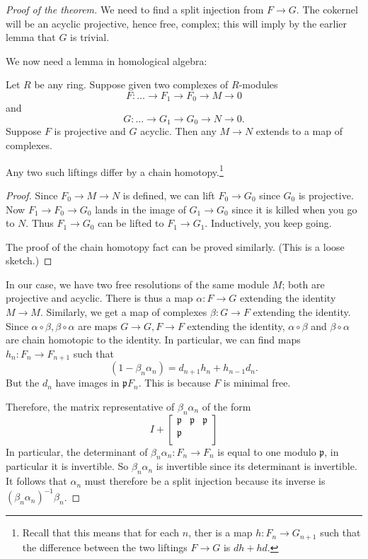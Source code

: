 \begin{proof}[Proof of the theorem]
We need to find a split injection from $F \to G$. The cokernel will be an
acyclic projective, hence free, complex; this will imply by the earlier lemma
that $G$ is trivial.

We now need a lemma in homological algebra:
\begin{lemma} Let $R$ be any ring.
Suppose given two complexes of $R$-modules
\[ F: \dots \to F_1 \to F_0 \to M \to 0  \]
and
\[ G: \dots \to G_1 \to G_0 \to N \to 0.  \]
Suppose $F$ is projective and $G$ acyclic. Then any $M \to N$ extends to a map
of complexes. 

Any two such liftings differ by a chain homotopy.\footnote{Recall that this
means that for each $n$, ther is a map $h: F_n \to G_{n+1}$ such that the
difference between the two liftings $F \to G$ is $dh +hd$.}
\end{lemma} 
\begin{proof}
Since $F_0 \to M \to N$ is defined, we can lift $F_0 \to G_0$ since $G_0$ is
projective. Now $F_1 \to F_0 \to G_0$ lands in the image of $G_1 \to G_0$ since
it is killed when you go to $N$. Thus $F_1 \to G_0$ can be lifted to $F_1 \to
G_1$. Inductively, you keep going.

The proof of the chain homotopy fact can be proved similarly. (This is a loose
sketch.)
\end{proof} 

In our case, we have two free resolutions of the same module $M$; both are
projective and acyclic. There is thus a map $\alpha: F \to G$ extending the identity $M
\to M$.  Similarly, we get a map of complexes $ \beta: G \to F$ extending the identity.
Since $\alpha \circ \beta, \beta \circ \alpha$ are maps $G \to G, F \to F$
extending the identity, $\alpha \circ \beta$ and $\beta \circ \alpha$ are chain
homotopic to the identity. In particular, we can find maps 
$h_n: F_n \to F_{n+1}$ such that
\[ (1 - \beta_n \alpha_n) = d_{n+1}h_n + h_{n-1}d_n.  \]
But the $d_n$ have images in $\mathfrak{p} F_{n}$. This is because $F$ is
minimal free.

Therefore, the matrix representative of $ \beta_n \alpha_n$ of the form 
\[ I + \begin{bmatrix}
\mathfrak{p} & \mathfrak{p} & \mathfrak{p} \\
\mathfrak{p} \\
\end{bmatrix}\]
In particular, the determinant of $\beta_n \alpha_n: F_n \to F_n$ is equal to
one modulo $\mathfrak{p}$, in particular it is invertible. So $\beta_n
\alpha_n$ is invertible since its determinant is invertible.  It follows that
$\alpha_n$ must therefore be a split injection because its inverse is $(\beta_n
\alpha_n)^{-1} \beta_n$. 
\end{proof} 



